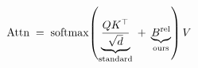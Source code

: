 \documentclass[preview]{standalone}
\begin{document}
\begin{align*}
\special{dvisvgm:raw <g id='unique000'>}\mathrm{Attn} \;=\; \mathrm{softmax}\!\left(\underbrace{\frac{Q K^{\top}}{\sqrt{d}}}_{\text{standard}}\;+\;\underbrace{B^{\mathrm{rel}}}_{\text{ours}}\right) V\special{dvisvgm:raw </g>}
\end{align*}
\end{document}
